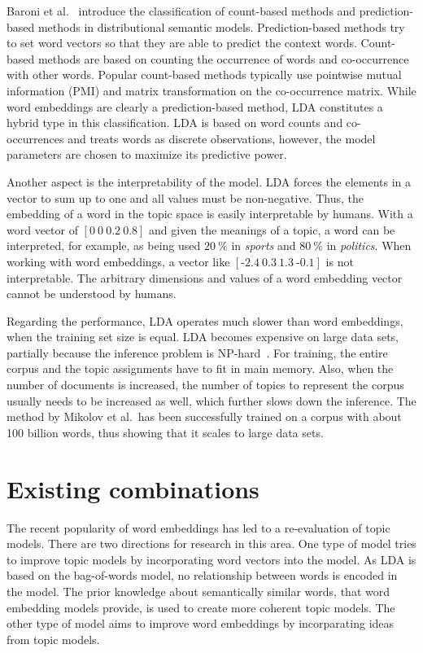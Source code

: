 \documentclass[
        a4paper,
        titlepage,
        twoside,
        parskip,
        numbers=noenddot
        ]{scrbook}
\theoremstyle{break}
\begin{document}
Baroni et al.~\cite{Baroni2014} introduce the classification of count-based methods and prediction-based methods in distributional semantic models.
Prediction-based methods try to set word vectors so that they are able to predict the context words.
Count-based methods are based on counting the occurrence of words and co-occurrence with other words.
Popular count-based methods typically use pointwise mutual information (PMI) and matrix transformation on the co-occurrence matrix.
While word embeddings are clearly a prediction-based method, LDA constitutes a hybrid type in this classification.
LDA is based on word counts and co-occurrences and treats words as discrete observations, however, the model parameters are chosen to maximize its predictive power.

Another aspect is the interpretability of the model.
LDA forces the elements in a vector to sum up to one and all values must be non-negative.
Thus, the embedding of a word in the topic space is easily interpretable by humans.
With a word vector of $[0~0~0.2~0.8]$ and given the meanings of a topic, a word can be interpreted, for example, as being used $20~\%$ in \emph{sports} and $80~\%$ in \emph{politics}.
When working with word embeddings, a vector like $[{\text{-}2.4}~0.3~1.3~{\text{-}0.1}]$ is not interpretable.
The arbitrary dimensions and values of a word embedding vector cannot be understood by humans.

Regarding the performance, LDA operates much slower than word embeddings, when the training set size is equal.
LDA becomes expensive on large data sets, partially because the inference problem is NP-hard~\cite{Sontag2011a}.
For training, the entire corpus and the topic assignments have to fit in main memory.
Also, when the number of documents is increased, the number of topics to represent the corpus usually needs to be increased as well, which further slows down the inference.
The method by Mikolov et al.\ has been successfully trained on a corpus with about 100 billion words, thus showing that it scales to large data sets.

\section{Existing combinations}
The recent popularity of word embeddings has led to a re-evaluation of topic models.
There are two directions for research in this area.
One type of model tries to improve topic models by incorporating word vectors into the model.
As LDA is based on the bag-of-words model, no relationship between words is encoded in the model.
The prior knowledge about semantically similar words, that word embedding models provide, is used to create more coherent topic models.
The other type of model aims to improve word embeddings by incorparating ideas from topic models.
\end{document}
